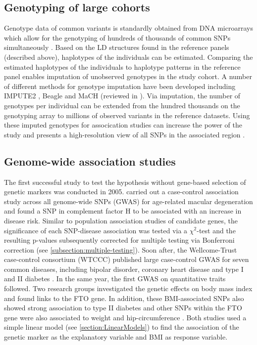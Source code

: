 \subsection{Genotyping of large cohorts}
Genotype data of common variants is standardly obtained from DNA microarrays which allow for the genotyping of hundreds of thousands of common SNPs simultaneously \citep{Wang1998}. Based on the LD structures found in the reference panels (described above), haplotypes of the individuals can be estimated. Comparing the estimated haplotypes of the individuals to haplotype patterns in the reference panel enables imputation of unobserved genotypes in the study cohort. A number of different methods for genotype imputation have been developed including IMPUTE2 \citep{Howie2009}, Beagle \citep{Browning2007} and MaCH \citep{Li2010} (reviewed in \citep{Marchini2010}). Via imputation, the number of genotypes per individual can be extended from the hundred thousands on the genotyping array to millions of observed variants in the reference datasets. Using these imputed genotypes for assocication studies can increase the power of the study and presents a high-resolution view of all SNPs in the associated region \citep{Marchini2010}.

\subsection{Genome-wide association studies}
\label{subsection:GWAS}
The first successful study to test the  hypothesis without gene-based selection of genetic markers was conducted in 2005. \citet{Klein2005} carried out a case-control association study across all genome-wide SNPs (GWAS) for age-related macular degeneration and found a SNP in complement factor H to be associated with an increase in disease risk. Similar to population association studies of candidate genes, the significance of each SNP-disease association was tested via a \(\chi ^2\)-test and the resulting p-values subsequently corrected for multiple testing via Bonferroni correction (see \cref{subsection:multiple-testing}). Soon after, the Wellcome-Trust case-control consortium (WTCCC) published large case-control GWAS for seven common diseases, including bipolar disorder, coronary heart disease and type I and II diabetes \citep{Burton2007}. In the same year, the first GWAS on quantitative traits followed. Two research groups investigated the genetic effects on body mass index and found links to the FTO gene. In addition, these BMI-associated SNPs also showed strong association to type II diabetes \citep{Frayling2007} and other SNPs within the FTO gene were also associated to weight and hip-circumference \citep{Scuteri2007}. Both studies used a simple linear model  (see \cref{section:LinearModels}) to find the association of the genetic marker as the explanatory variable and BMI as response variable. 

